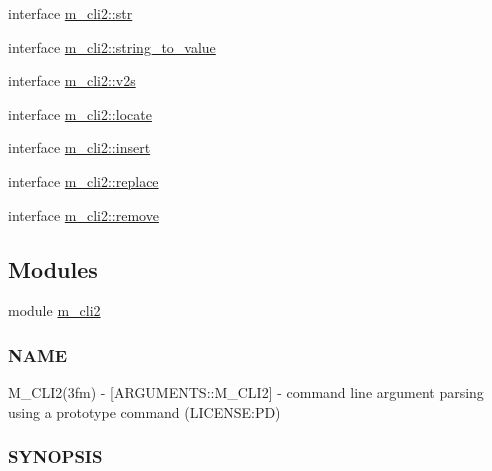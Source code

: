 \begin{DoxyCompactItemize}
\item 
interface \mbox{\hyperlink{interfacem__cli2_1_1str}{m\+\_\+cli2\+::str}}
\item 
interface \mbox{\hyperlink{interfacem__cli2_1_1string__to__value}{m\+\_\+cli2\+::string\+\_\+to\+\_\+value}}
\item 
interface \mbox{\hyperlink{interfacem__cli2_1_1v2s}{m\+\_\+cli2\+::v2s}}
\item 
interface \mbox{\hyperlink{interfacem__cli2_1_1locate}{m\+\_\+cli2\+::locate}}
\item 
interface \mbox{\hyperlink{interfacem__cli2_1_1insert}{m\+\_\+cli2\+::insert}}
\item 
interface \mbox{\hyperlink{interfacem__cli2_1_1replace}{m\+\_\+cli2\+::replace}}
\item 
interface \mbox{\hyperlink{interfacem__cli2_1_1remove}{m\+\_\+cli2\+::remove}}
\end{DoxyCompactItemize}
\subsection*{Modules}
\begin{DoxyCompactItemize}
\item 
module \mbox{\hyperlink{namespacem__cli2}{m\+\_\+cli2}}
\begin{DoxyCompactList}\small\item\em \subsubsection*{N\+A\+ME}

M\+\_\+\+C\+L\+I2(3fm) -\/ \mbox{[}A\+R\+G\+U\+M\+E\+N\+T\+S\+::\+M\+\_\+\+C\+L\+I2\mbox{]} -\/ command line argument parsing using a prototype command (L\+I\+C\+E\+N\+SE\+:PD) \subsubsection*{S\+Y\+N\+O\+P\+S\+IS}\end{DoxyCompactList}\end{DoxyCompactItemize}
